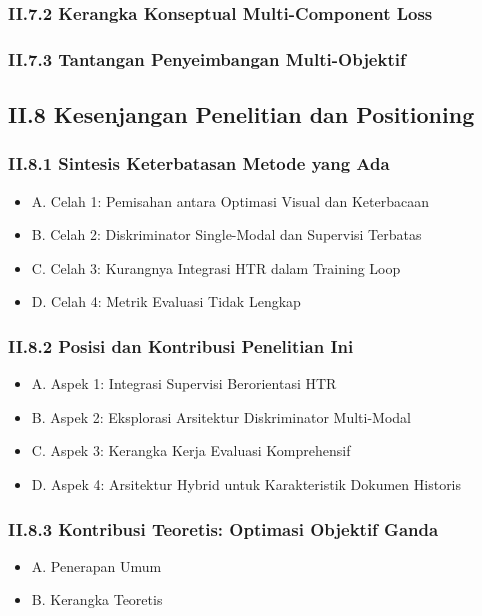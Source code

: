 \documentclass[11pt,a4paper]{article}
\begin{document}
\subsubsection*{II.7.2 Kerangka Konseptual Multi-Component Loss}

\subsubsection*{II.7.3 Tantangan Penyeimbangan Multi-Objektif}

\vspace{0.5em}

\subsection*{II.8 Kesenjangan Penelitian dan Positioning}

\subsubsection*{II.8.1 Sintesis Keterbatasan Metode yang Ada}
\begin{itemize}[label={}, leftmargin=2em]
    \item A. Celah 1: Pemisahan antara Optimasi Visual dan Keterbacaan
    \item B. Celah 2: Diskriminator Single-Modal dan Supervisi Terbatas
    \item C. Celah 3: Kurangnya Integrasi HTR dalam Training Loop
    \item D. Celah 4: Metrik Evaluasi Tidak Lengkap
\end{itemize}

\subsubsection*{II.8.2 Posisi dan Kontribusi Penelitian Ini}
\begin{itemize}[label={}, leftmargin=2em]
    \item A. Aspek 1: Integrasi Supervisi Berorientasi HTR
    \item B. Aspek 2: Eksplorasi Arsitektur Diskriminator Multi-Modal
    \item C. Aspek 3: Kerangka Kerja Evaluasi Komprehensif
    \item D. Aspek 4: Arsitektur Hybrid untuk Karakteristik Dokumen Historis
\end{itemize}

\subsubsection*{II.8.3 Kontribusi Teoretis: Optimasi Objektif Ganda}
\begin{itemize}[label={}, leftmargin=2em]
    \item A. Penerapan Umum
    \item B. Kerangka Teoretis
\end{itemize}
\end{document}
